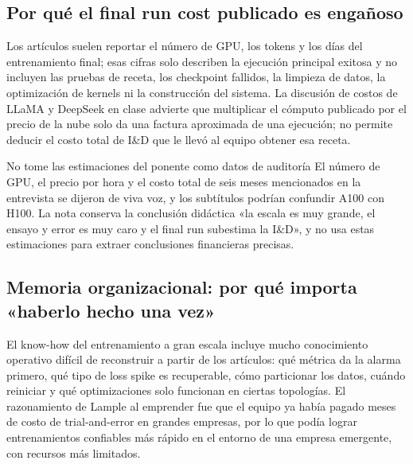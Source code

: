 \subsection{Por qué el final run cost publicado es engañoso}

Los artículos suelen reportar el número de GPU, los tokens y los días del entrenamiento final; esas cifras solo describen la ejecución principal exitosa y no incluyen las pruebas de receta, los checkpoint fallidos, la limpieza de datos, la optimización de kernels ni la construcción del sistema. La discusión de costos de LLaMA y DeepSeek en clase advierte que multiplicar el cómputo publicado por el precio de la nube solo da una factura aproximada de una ejecución; no permite deducir el costo total de I\&D que le llevó al equipo obtener esa receta.


\begin{warningbox}{No tome las estimaciones del ponente como datos de auditoría}
El número de GPU, el precio por hora y el costo total de seis meses mencionados en la entrevista se dijeron de viva voz, y los subtítulos podrían confundir A100 con H100. La nota conserva la conclusión didáctica «la escala es muy grande, el ensayo y error es muy caro y el final run subestima la I\&D», y no usa estas estimaciones para extraer conclusiones financieras precisas.
\end{warningbox}

\subsection{Memoria organizacional: por qué importa «haberlo hecho una vez»}

El know-how del entrenamiento a gran escala incluye mucho conocimiento operativo difícil de reconstruir a partir de los artículos: qué métrica da la alarma primero, qué tipo de loss spike es recuperable, cómo particionar los datos, cuándo reiniciar y qué optimizaciones solo funcionan en ciertas topologías. El razonamiento de Lample al emprender fue que el equipo ya había pagado meses de costo de trial-and-error en grandes empresas, por lo que podía lograr entrenamientos confiables más rápido en el entorno de una empresa emergente, con recursos más limitados.

